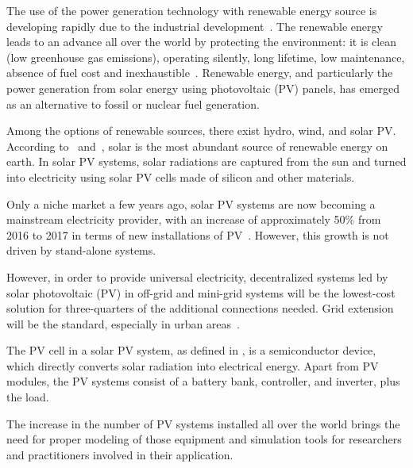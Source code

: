 The use of the power generation technology with renewable energy source is developing rapidly due to the industrial development~\cite{Yatimi}. The renewable energy leads to an advance all over the world by protecting the environment: it is clean (low greenhouse gas emissions), operating silently, long lifetime, low maintenance, absence of fuel cost and inexhaustible~\cite{Noroozian}. Renewable energy, and particularly the power generation from solar energy using photovoltaic (PV) panels, has emerged as an alternative to fossil or nuclear fuel generation. 

Among the options of renewable sources, there exist hydro, wind, and solar PV. According to~\cite{SEIA} and~\cite{Chauhan}, solar is the most abundant source of renewable energy on earth. In solar PV systems, solar radiations are captured from the sun and turned into electricity using solar PV cells made of silicon and other materials.

Only a niche market a few years ago, solar PV systems are now becoming a mainstream electricity provider, with an increase of approximately 50\% from 2016 to 2017 in terms of new installations of PV~\cite{EPIA}. However, this growth is not driven by stand-alone systems.

However, in order to provide universal electricity, decentralized systems led by solar photovoltaic (PV) in off-grid and mini-grid systems will be the lowest-cost solution for three-quarters of the additional connections needed. Grid extension will be the standard, especially in urban areas~\cite{IEAweo2018}.

The PV cell in a solar PV system, as defined in \cite{Rawat}, is a semiconductor device, which directly converts solar radiation into electrical energy. Apart from PV modules, the PV systems consist of a battery bank, controller, and inverter, plus the load.
%
%

The increase in the number of PV systems installed all over the world brings the need for proper modeling of those equipment and simulation tools for researchers and practitioners involved in their application. 

